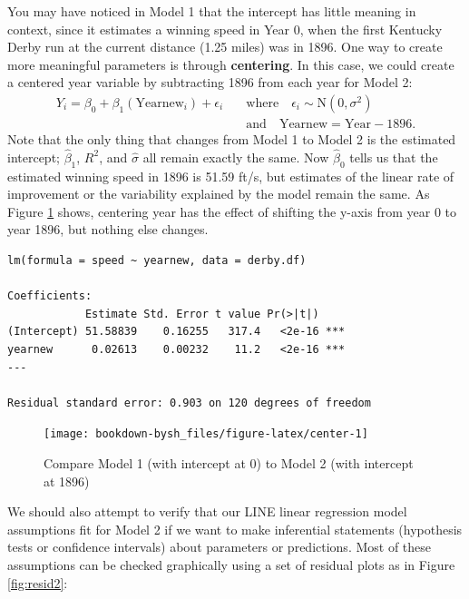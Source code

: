 \documentclass[
]{krantz}
\begin{document}
You may have noticed in Model 1 that the intercept has little meaning in context, since it estimates a winning speed in Year 0, when the first Kentucky Derby run at the current distance (1.25 miles) was in 1896. One way to create more meaningful parameters is through \textbf{centering}. In this case, we could create a centered year variable by subtracting 1896 from each year for Model 2:
\begin{equation}
\begin{split}
Y_{i}=\beta_{0}+\beta_{1}(\textrm{Yearnew}_{i})+\epsilon_{i}\quad &\textrm{where} \quad \epsilon_{i}\sim \textrm{N}(0,\sigma^2) \\
    &\textrm{and} \quad \textrm{Yearnew}=\textrm{Year}-1896.
\end{split}
\label{eq:model2}
\end{equation}
Note that the only thing that changes from Model 1 to Model 2 is the estimated intercept; \(\hat{\beta}_{1}\), \(R^2\), and \(\hat{\sigma}\) all remain exactly the same. Now \(\hat{\beta}_{0}\) tells us that the estimated winning speed in 1896 is 51.59 ft/s, but estimates of the linear rate of improvement or the variability explained by the model remain the same. As Figure \ref{fig:center} shows, centering year has the effect of shifting the y-axis from year 0 to year 1896, but nothing else changes.

\begin{verbatim}
lm(formula = speed ~ yearnew, data = derby.df)

Coefficients:
            Estimate Std. Error t value Pr(>|t|)    
(Intercept) 51.58839    0.16255   317.4   <2e-16 ***
yearnew      0.02613    0.00232    11.2   <2e-16 ***
---

Residual standard error: 0.903 on 120 degrees of freedom
\end{verbatim}

\begin{figure}

{\centering \texttt{[image: bookdown-bysh\_files/figure-latex/center-1]} 

}

\caption{Compare Model 1 (with intercept at 0) to Model 2 (with intercept at 1896)}\label{fig:center}
\end{figure}

We should also attempt to verify that our LINE linear regression model assumptions fit for Model 2 if we want to make inferential statements (hypothesis tests or confidence intervals) about parameters or predictions. Most of these assumptions can be checked graphically using a set of residual plots as in Figure \ref{fig:resid2}:
\end{document}
